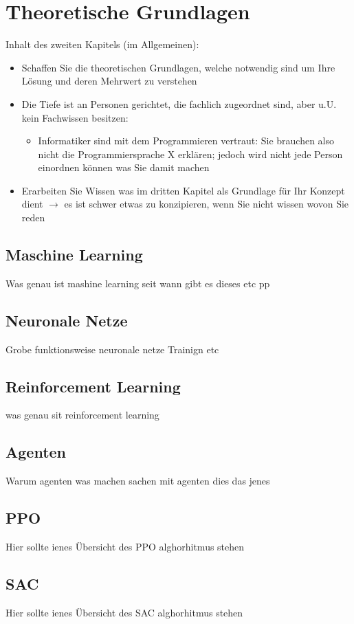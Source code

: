 

\clearpage
\chapter{Theoretische Grundlagen}
Inhalt des zweiten Kapitels (im Allgemeinen):
\begin{itemize}
    \item Schaffen Sie die theoretischen Grundlagen, welche notwendig sind um Ihre Lösung und deren Mehrwert zu verstehen
    \item Die Tiefe ist an Personen gerichtet, die fachlich zugeordnet sind, aber u.U. kein Fachwissen besitzen:
    \begin{itemize}
        \item Informatiker sind mit dem Programmieren vertraut: Sie brauchen also nicht die Programmiersprache X erklären; jedoch wird nicht jede Person einordnen können was Sie damit machen
    \end{itemize}
    \item Erarbeiten Sie Wissen was im dritten Kapitel als Grundlage für Ihr Konzept dient $\rightarrow$ es ist schwer etwas zu konzipieren, wenn Sie nicht wissen wovon Sie reden
\end{itemize}

\section{Maschine Learning}
Was genau ist mashine learning seit wann gibt es dieses etc pp

\section{Neuronale Netze}
Grobe funktionsweise neuronale netze Trainign etc

\section{Reinforcement Learning}
was genau sit reinforcement learning


\section{Agenten}
Warum agenten was machen sachen mit agenten dies das jenes

\section{PPO}
Hier sollte ienes Übersicht des PPO alghorhitmus stehen

\section{SAC}
Hier sollte ienes Übersicht des SAC alghorhitmus stehen

